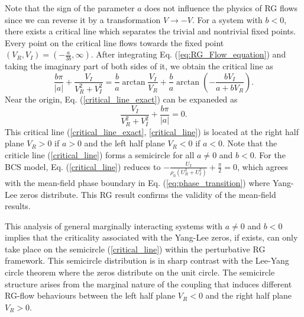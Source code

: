 \documentclass[aps,prl,twocolumn,nofootinbib,superscriptaddress,notitlepage,longbibliography]{revtex4-1}
\begin{document}
	 Note that the sign of the parameter $a$ does not influence the physics of RG flows since we can reverse it by a transformation $V\to-V$. For a system with $b<0$, there exists a critical line which separates the trivial and nontrivial fixed points. Every point on the critical line flows towards the fixed point $(V_R, V_I) = (-\frac{a}{3b}, \infty)$. %
	 After integrating Eq. (\ref{eq:RG_Flow_equation}) and taking the imaginary part of both sides of it, we obtain the critical line as
	\begin{equation}
		\frac{b\pi}{|a|}+\frac{V_I}{V_R^2+V_I^2}=\frac{b}{a}\arctan{\frac{V_I}{V_R}}+\frac{b}{a}\arctan{(-\frac{b V_I}{a+b V_R})}.
		\label{critical_line_exact}
	\end{equation}
	Near the origin, Eq. (\ref{critical_line_exact}) can be expaneded as
	\begin{equation}
		\frac{V_I}{V_R^2+V_I^2}+\frac{b\pi}{|a|}=0.
		\label{critical_line}
	\end{equation}
	This critical line (\ref{critical_line_exact}, \ref{critical_line}) is located at the right half plane $V_R>0$ if $a>0$ and the left half plane $V_R<0$ if $a<0$. Note that the criticle line (\ref{critical_line}) forms a semicircle for all $a\neq0$ and $b<0$. For the BCS model, Eq. (\ref{critical_line}) reduces to $-\frac{U_I}{\rho_0(U_R^2+U_I^2)}+\frac{\pi}{2}=0$, which agrees with the mean-field phase boundary in Eq. (\ref{eq:phase_transition}) where Yang-Lee zeros distribute. This RG result confirms the validity of the mean-field results. %
	
	
	This analysis of general marginally interacting systems with $a \neq 0$ and $b < 0$ implies that the criticality associated with the Yang-Lee zeros, if exists, can only take place on the semicircle (\ref{critical_line}) within the perturbative RG framework. %
	This semicircle distribution is in sharp contrast with the Lee-Yang circle theorem \cite{PhysRev.87.410} where the zeros distribute on the unit circle. The semicircle structure arises from the marginal nature of the coupling that induces different RG-flow behaviours between the left half plane $V_R<0$ and the right half plane $V_R>0$. 
	
\end{document}
